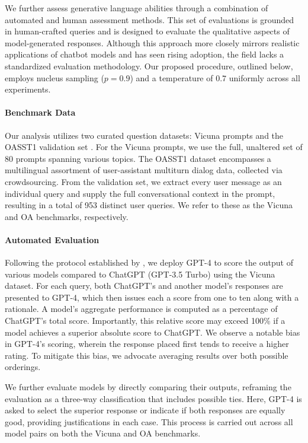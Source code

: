 We further assess generative language abilities through a combination of automated and human assessment methods. This set of evaluations is grounded in human-crafted queries and is designed to evaluate the qualitative aspects of model-generated responses. Although this approach more closely mirrors realistic applications of chatbot models and has seen rising adoption, the field lacks a standardized evaluation methodology. Our proposed procedure, outlined below, employs nucleus sampling ($p=0.9$) and a temperature of $0.7$ uniformly across all experiments.

\paragraph{Benchmark Data} Our analysis utilizes two curated question datasets: Vicuna prompts \citep{vicuna2023} and the OASST1 validation set \citep{kopf2023openassistant}. For the Vicuna prompts, we use the full, unaltered set of 80 prompts spanning various topics. The OASST1 dataset encompasses a multilingual assortment of user-assistant multiturn dialog data, collected via crowdsourcing. From the validation set, we extract every user message as an individual query and supply the full conversational context in the prompt, resulting in a total of 953 distinct user queries. We refer to these as the Vicuna and OA benchmarks, respectively.

\paragraph{Automated Evaluation} Following the protocol established by \citet{vicuna2023}, we deploy GPT-4 to score the output of various models compared to ChatGPT (GPT-3.5 Turbo) using the Vicuna dataset. For each query, both ChatGPT's and another model's responses are presented to GPT-4, which then issues each a score from one to ten along with a rationale. A model’s aggregate performance is computed as a percentage of ChatGPT’s total score. Importantly, this relative score may exceed 100\% if a model achieves a superior absolute score to ChatGPT. We observe a notable bias in GPT-4’s scoring, wherein the response placed first tends to receive a higher rating. To mitigate this bias, we advocate averaging results over both possible orderings.

We further evaluate models by directly comparing their outputs, reframing the evaluation as a three-way classification that includes possible ties. Here, GPT-4 is asked to select the superior response or indicate if both responses are equally good, providing justifications in each case. This process is carried out across all model pairs on both the Vicuna and OA benchmarks.

